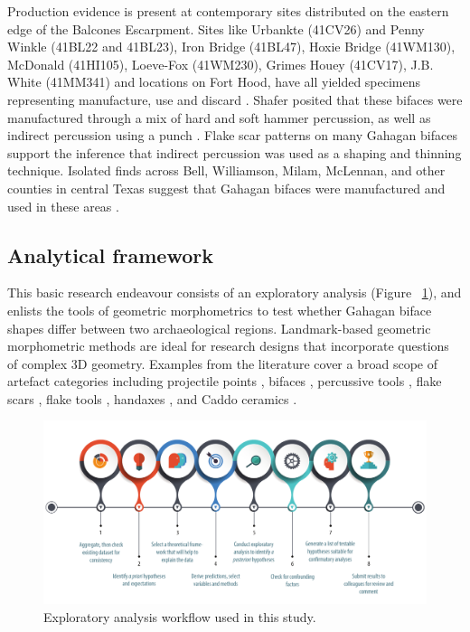 \documentclass[review]{elsarticle}
\begin{document}
Production evidence is present at contemporary sites distributed on the eastern edge of the Balcones Escarpment. Sites like Urbankte (41CV26) and Penny Winkle (41BL22 and 41BL23), Iron Bridge (41BL47), Hoxie Bridge (41WM130), McDonald (41HI105), Loeve-Fox (41WM230), Grimes Houey (41CV17), J.B. White (41MM341) and locations on Fort Hood, have all yielded specimens representing manufacture, use and discard \citep{RN20717,RN11565,RN2708,RN20718,RN4924,RN20719}. Shafer posited that these bifaces were manufactured through a mix of hard and soft hammer percussion, as well as indirect percussion using a punch \citep{RN4924,RN3684}. Flake scar patterns on many Gahagan bifaces support the inference that indirect percussion was used as a shaping and thinning technique. Isolated finds across Bell, Williamson, Milam, McLennan, and other counties in central Texas suggest that Gahagan bifaces were manufactured and used in these areas \citep{RN4924}.

\subsection*{Analytical framework}

This basic research endeavour \citep{RN20851} consists of an exploratory analysis (Figure ~\ref{fig:exan}), and enlists the tools of geometric morphometrics to test whether Gahagan biface shapes differ between two archaeological regions. Landmark-based geometric morphometric methods are ideal for research designs that incorporate questions of complex 3D geometry. Examples from the literature cover a broad scope of artefact categories including projectile points \citep{RN1750,RN1755}, bifaces \citep{RN1727,RN4392,RN11550,RN11783}, percussive tools \citep{RN1772}, flake scars \citep{RN253}, flake tools \citep{RN11552}, handaxes \citep{RN1730,RN1766,RN3145,RN1733,RN335}, and Caddo ceramics \citep{RN1994,RN11521,RN11782,RN11801,RN11716,RN20852}. 

\begin{figure}[ht]\centering
\includegraphics[width=\linewidth]{figexan.pdf}
\caption{Exploratory analysis workflow used in this study.}
\label{fig:exan}
\end{figure}
\end{document}
